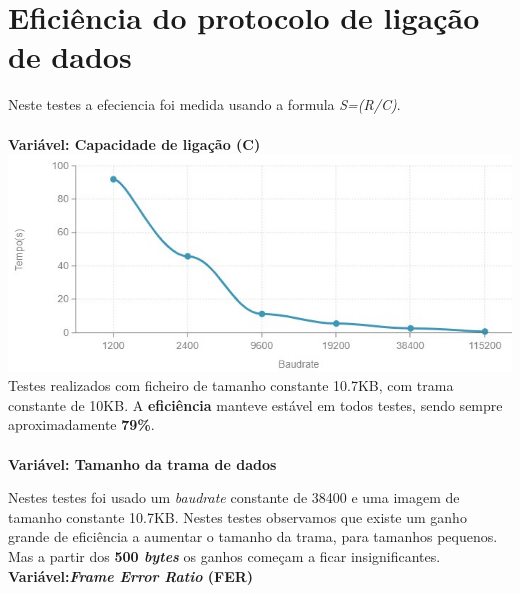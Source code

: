 \documentclass[11pt]{article}
\begin{document}
\newpage
\thispagestyle{fancy}
\fancyhf{}
\fancyfoot[R]{\thepage}
\renewcommand*{\footrulewidth}{1pt}

\section*{Eficiência do protocolo de ligação de dados}
Neste testes a efeciencia foi medida usando a formula \emph{S=(R/C)}.\\\\
\textbf{Variável: Capacidade de ligação (C) }\\
\includegraphics[scale=0.6]{CVAR.jpg}\\
Testes realizados com ficheiro de tamanho constante 10.7KB, com trama constante de 10KB. A \textbf{eficiência} manteve estável em todos testes, sendo sempre aproximadamente \textbf{79\%}.\\\\

\textbf{Variável: Tamanho da trama de dados}
\begin{center}
\end{center}
Nestes testes foi usado um \emph{baudrate} constante de 38400 e uma imagem de tamanho constante 10.7KB. Nestes testes observamos que existe um ganho grande de eficiência a aumentar o tamanho da trama, para tamanhos pequenos. Mas a partir dos \textbf{500 \emph{bytes}} os ganhos começam a ficar insignificantes.
\newpage
\thispagestyle{fancy}
\fancyhf{}
\fancyfoot[R]{\thepage}
\renewcommand*{\footrulewidth}{1pt}
\textbf{Variável:\emph{Frame Error Ratio} (FER) }\\
\end{document}
